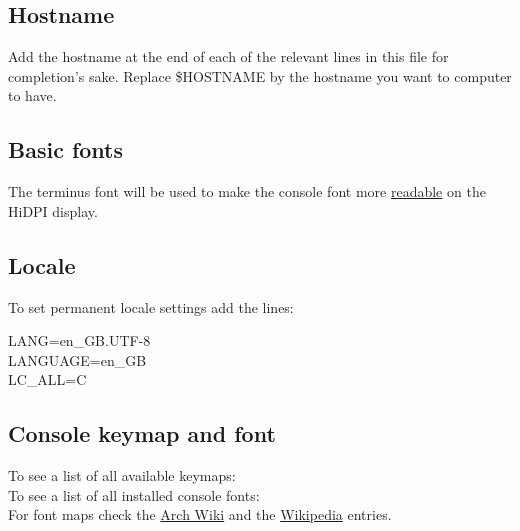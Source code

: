 \subsection{Hostname}

\begin{blocksection}
	Add the hostname at the end of each of the relevant lines in this file for completion's sake. Replace \textcolor{codekeyword1}{\$HOSTNAME} by the hostname you want to computer to have.
\end{blocksection}

\subsection{Basic fonts}

\begin{blocksection}
	The terminus font will be used to make the console font more \href{https://wiki.archlinux.org/index.php/HiDPI#Linux_console}{readable} on the HiDPI display.
\end{blocksection}

\subsection{Locale}

\begin{blocksection}
	To set permanent locale settings add the lines:\\
	\begin{codeblock}
		LANG=en\_GB.UTF-8\\
		LANGUAGE=en\_GB\\
		LC\_ALL=C
	\end{codeblock}
\end{blocksection}

\subsection{Console keymap and font}

To see a list of all available keymaps: \\
To see a list of all installed console fonts: \\
For font maps check the \href{https://wiki.archlinux.org/index.php/fonts#Persistent_configuration}{Arch Wiki} and the \href{https://en.wikipedia.org/wiki/ISO/IEC_8859#The_parts_of_ISO/IEC_8859}{Wikipedia} entries.

